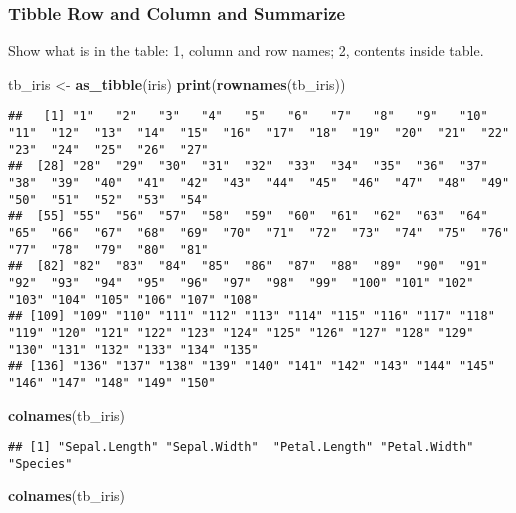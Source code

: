 \documentclass[
]{book}
\newenvironment{Shaded}{\begin{snugshade}}{\end{snugshade}}
\newcommand{\KeywordTok}[1]{\textcolor[rgb]{0.13,0.29,0.53}{\textbf{#1}}}
\newcommand{\NormalTok}[1]{#1}
\newcommand{\StringTok}[1]{\textcolor[rgb]{0.31,0.60,0.02}{#1}}
\begin{document}
\hypertarget{tibble-row-and-column-and-summarize}{%
\subsubsection{Tibble Row and Column and Summarize}\label{tibble-row-and-column-and-summarize}}

Show what is in the table: 1, column and row names; 2, contents inside table.

\begin{Shaded}
\begin{Highlighting}[]
\NormalTok{tb_iris <-}\StringTok{ }\KeywordTok{as_tibble}\NormalTok{(iris)}
\KeywordTok{print}\NormalTok{(}\KeywordTok{rownames}\NormalTok{(tb_iris))}
\end{Highlighting}
\end{Shaded}

\begin{verbatim}
##   [1] "1"   "2"   "3"   "4"   "5"   "6"   "7"   "8"   "9"   "10"  "11"  "12"  "13"  "14"  "15"  "16"  "17"  "18"  "19"  "20"  "21"  "22"  "23"  "24"  "25"  "26"  "27" 
##  [28] "28"  "29"  "30"  "31"  "32"  "33"  "34"  "35"  "36"  "37"  "38"  "39"  "40"  "41"  "42"  "43"  "44"  "45"  "46"  "47"  "48"  "49"  "50"  "51"  "52"  "53"  "54" 
##  [55] "55"  "56"  "57"  "58"  "59"  "60"  "61"  "62"  "63"  "64"  "65"  "66"  "67"  "68"  "69"  "70"  "71"  "72"  "73"  "74"  "75"  "76"  "77"  "78"  "79"  "80"  "81" 
##  [82] "82"  "83"  "84"  "85"  "86"  "87"  "88"  "89"  "90"  "91"  "92"  "93"  "94"  "95"  "96"  "97"  "98"  "99"  "100" "101" "102" "103" "104" "105" "106" "107" "108"
## [109] "109" "110" "111" "112" "113" "114" "115" "116" "117" "118" "119" "120" "121" "122" "123" "124" "125" "126" "127" "128" "129" "130" "131" "132" "133" "134" "135"
## [136] "136" "137" "138" "139" "140" "141" "142" "143" "144" "145" "146" "147" "148" "149" "150"
\end{verbatim}

\begin{Shaded}
\begin{Highlighting}[]
\KeywordTok{colnames}\NormalTok{(tb_iris)}
\end{Highlighting}
\end{Shaded}

\begin{verbatim}
## [1] "Sepal.Length" "Sepal.Width"  "Petal.Length" "Petal.Width"  "Species"
\end{verbatim}

\begin{Shaded}
\begin{Highlighting}[]
\KeywordTok{colnames}\NormalTok{(tb_iris)}
\end{Highlighting}
\end{Shaded}
\end{document}
